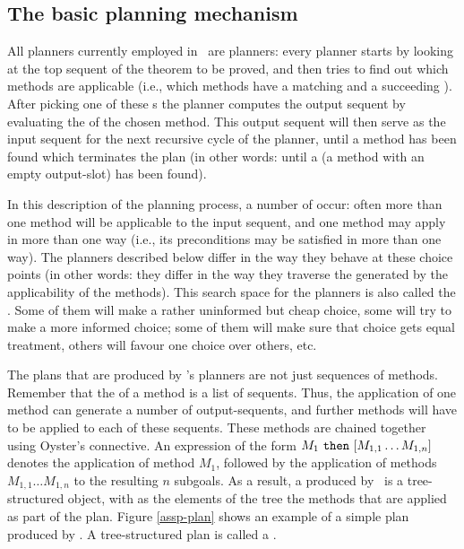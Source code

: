 \subsection {The basic planning mechanism}
\label{planning-mech}

All planners currently employed in \clam\ are 
planners: every planner starts by looking at the top sequent of the
theorem to be proved, and then tries to find out which methods are
applicable (i.e., which methods have a matching  and a
succeeding ). After picking one of these
s the planner computes the output sequent
by evaluating the  of the chosen method. This
output sequent will then serve as the input sequent for the next
recursive cycle of the planner, until a method has been found which
terminates the plan (in other words: until a 
(a method with an empty output-slot) has been found).

In this description of the planning process, a number of 
occur: often more than one method will be applicable to the input
sequent, and one method may apply in more than one way (i.e., its
preconditions may be satisfied in more than one way). The planners
described below differ in the way they behave at these choice points
(in other words: they differ in the way they traverse the 
generated by the applicability of the methods). This search space for
the planners is also called the {\em {}}.
Some of them will make a rather uninformed but cheap
choice, some will try to make a more informed choice; some of them
will make sure that choice gets equal treatment, others will favour
one choice over others, etc.

The plans that are produced by {\clam}'s planners are not just sequences
of methods. Remember that the  of a method is a list
of sequents. Thus, the application of one method can generate a number
of output-sequents, and further methods will have to be applied
to each of these sequents. These methods are chained together using
Oyster's  connective. An expression of the form
$M_1 {\tt \ then\ } [M_{1,1}\ldots M_{1,n}]$ denotes the application of
method $M_1$, followed by the application of methods
$M_{1,1}\ldots M_{1,n}$ to the resulting $n$ subgoals. As a result, a
 produced by \clam\ is a tree-structured object, with as the
elements of the tree the methods that are applied as part of the plan.
Figure \ref{assp-plan} shows an example of a simple plan produced by
\clam. A tree-structured plan is called a {\em {}}. 

